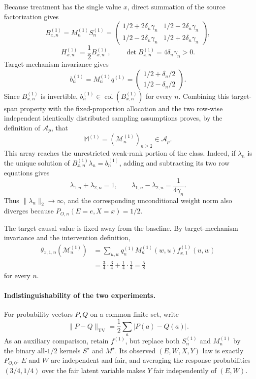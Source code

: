 Because treatment has the single value \(x\), direct summation of the source factorization gives
\[
B^{(1)}_{x,n}=M^{(1)}_nS^{(1)}_n=
\begin{pmatrix}
1/2+2\delta_n\gamma_n&1/2-2\delta_n\gamma_n\\
1/2-2\delta_n\gamma_n&1/2+2\delta_n\gamma_n
\end{pmatrix},
\]
\[
H^{(1)}_{x,n}=\frac12B^{(1)}_{x,n},
\qquad
\det B^{(1)}_{x,n}=4\delta_n\gamma_n>0.
\]
Target-mechanism invariance gives
\[
b^{(1)}_n=M^{(1)}_nq^{(1)}=
\begin{pmatrix}1/2+\delta_n/2\\1/2-\delta_n/2\end{pmatrix}.
\]
Since \(B^{(1)}_{x,n}\) is invertible, \(b^{(1)}_n\in\operatorname{col}(B^{(1)}_{x,n})\) for every \(n\). Combining this target-span property with the fixed-proportion allocation and the two row-wise independent identically distributed sampling assumptions proves, by the definition of \(\mathcal A_p\), that
\[
\mathbb M^{(1)}=(\mathcal M^{(1)}_n)_{n\ge2}\in\mathcal A_p.
\]
This array reaches the unrestricted weak-rank portion of the class. Indeed, if \(\lambda_n\) is the unique solution of \(B^{(1)}_{x,n}\lambda_n=b^{(1)}_n\), adding and subtracting its two row equations gives
\[
\lambda_{1,n}+\lambda_{2,n}=1,
\qquad
\lambda_{1,n}-\lambda_{2,n}=\frac{1}{4\gamma_n}.
\]
Thus \(\lVert\lambda_n\rVert_2\to\infty\), and the corresponding unconditional weight norm also diverges because \(P_{O,n}(E=e,X=x)=1/2\).

The target causal value is fixed away from the baseline. By target-mechanism invariance and the intervention definition,
\[
\begin{split}
\theta_{x,1,n}(\mathcal M^{(1)}_n)
&=\sum_{u,w}q^{(1)}_uM^{(1)}_n(w,u)f^{(1)}_{x,1}(u,w)\\
&=\frac34\cdot\frac34+\frac14\cdot\frac14
=\frac58
\end{split}
\]
for every \(n\).

\paragraph{Indistinguishability of the two experiments.}
For probability vectors \(P,Q\) on a common finite set, write
\[
\lVert P-Q\rVert_{\mathrm{TV}}=\frac12\sum_a|P(a)-Q(a)|.
\]
As an auxiliary comparison, retain \(f^{(1)}\), but replace both \(S^{(1)}_n\) and \(M^{(1)}_n\) by the binary all-\(1/2\) kernels \(S^{\star}\) and \(M^{\star}\). Its observed \((E,W,X,Y)\) law is exactly \(P_{O,0}\): \(E\) and \(W\) are independent and fair, and averaging the response probabilities \((3/4,1/4)\) over the fair latent variable makes \(Y\) fair independently of \((E,W)\).

